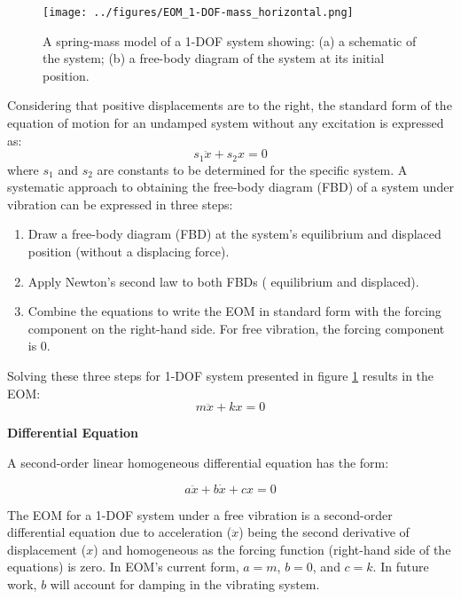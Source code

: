 \documentclass[12pt,letter]{article}
\begin{document}
		\begin{figure}[H]
			\centering
			\texttt{[image: ../figures/EOM\_1-DOF-mass\_horizontal.png]}
			\caption{A spring-mass model of a 1-DOF system showing: (a) a schematic of the system; (b) a free-body diagram of the system at its initial position.}
			\label{fig:EOM_1-DOF-mass_horizontal}
		\end{figure}			

		Considering that positive displacements are to the right, the standard form of the equation of motion for an undamped system without any excitation is expressed as:  
		\begin{equation}
			s_1 \ddot{x} + s_2 x = 0
		\end{equation}			
		where $s_1$ and $s_2$ are constants to be determined for the specific system. A systematic approach to obtaining the free-body diagram (FBD) of a system under vibration can be expressed in three steps:
		\begin{enumerate}
			\item Draw a free-body diagram (FBD) at the system's equilibrium and displaced position (without a displacing force).
			\item Apply Newton's second law to both FBDs ( equilibrium and displaced).
			\item Combine the equations to write the EOM in standard form with the forcing component on the right-hand side. For free vibration, the forcing component is 0. 
		\end{enumerate}
			
		Solving these three steps for 1-DOF system presented in figure \ref{fig:EOM_1-DOF-mass_horizontal} results in the EOM:
		\begin{equation}
			m \ddot{x} + k x = 0
		\end{equation}

\pagebreak

		\begin{review}

			\textbf{Differential Equation}

			\noindent A second-order linear homogeneous differential equation has the form:
			
			\begin{equation}
			 a \ddot{x} + b \dot{x} + cx = 0
			\end{equation}
		
			\noindent The EOM for a 1-DOF system under a free vibration is a second-order differential equation due to acceleration ($\ddot{x}$) being the second derivative of displacement ($x$) and homogeneous as the forcing function (right-hand side of the equations) is zero. In EOM's current form, $a=m$, $b=0$,  and $c=k$. In future work, $b$ will account for damping in the vibrating system.     
		\end{review}
\end{document}
